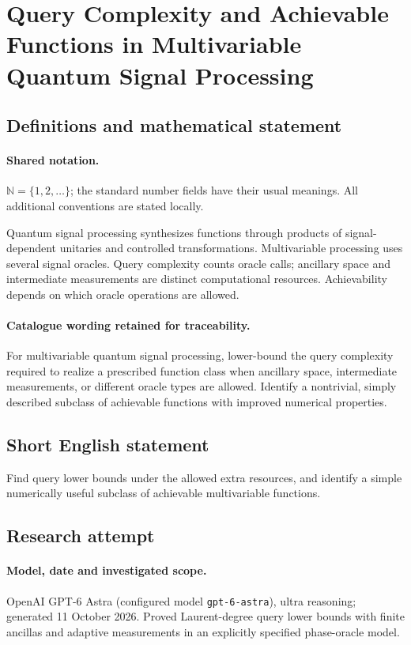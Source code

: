 \documentclass[11pt]{article}
\begin{document}
\section{Query Complexity and Achievable Functions in Multivariable Quantum Signal Processing}\label{statement}

\subsection{Definitions and mathematical statement}

\paragraph{Shared notation.}$\mathbb N=\{1,2,\ldots\}$; the standard number fields have their usual meanings. All additional conventions are stated locally.


Quantum signal processing synthesizes functions through products of signal-dependent unitaries and controlled transformations. Multivariable processing uses several signal oracles. Query complexity counts oracle calls; ancillary space and intermediate measurements are distinct computational resources. Achievability depends on which oracle operations are allowed.

\paragraph{Catalogue wording retained for traceability.}
For multivariable quantum signal processing, lower-bound the query complexity required to realize a prescribed function class when ancillary space, intermediate measurements, or different oracle types are allowed. Identify a nontrivial, simply described subclass of achievable functions with improved numerical properties.
\subsection{Short English statement}
Find query lower bounds under the allowed extra resources, and identify a simple numerically useful subclass of achievable multivariable functions.
\subsection{Research attempt}
\paragraph{Model, date and investigated scope.}
OpenAI GPT-6 Astra (configured model \texttt{gpt-6-astra}), ultra reasoning; generated 11 October 2026. Proved Laurent-degree query lower bounds with finite ancillas and adaptive measurements in an explicitly specified phase-oracle model.
\end{document}
